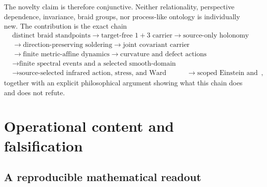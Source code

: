 The novelty claim is therefore conjunctive. Neither relationality, perspective dependence, invariance, braid groups, nor process-like ontology is individually new. The contribution is the exact chain
\begin{equation}\label{eq:novelchain}
\begin{aligned}
&\text{distinct braid standpoints}
\longrightarrow\text{target-free $1+3$ carrier}
\longrightarrow\text{source-only holonomy}\\
&\longrightarrow\text{direction-preserving soldering}
\longrightarrow\text{joint covariant carrier}\\
&\longrightarrow\text{finite metric-affine dynamics}
\longrightarrow\text{curvature and defect actions}\\
&\longrightarrow\text{finite spectral events and a selected smooth-domain matter action}\\
&\longrightarrow\text{source-selected infrared action, stress, and Ward identity}\
&\longrightarrow\text{scoped Einstein and massless spin-2 limit},
\end{aligned}
\end{equation}
together with an explicit philosophical argument showing what this chain does and does not refute.

\section{Operational content and falsification}

\subsection{A reproducible mathematical readout}

